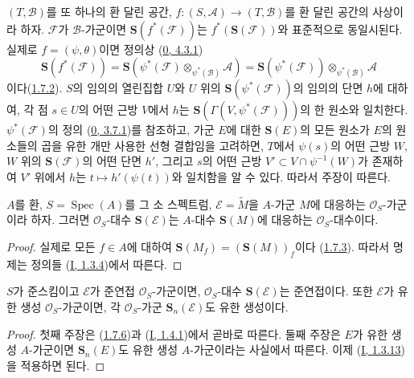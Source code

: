 \begin{env}[1.7.5]
\label{II.1.7.5-ko}
$(T,\mathcal{B})$를 또 하나의 환 달린 공간,
$f:(S,\mathcal{A})\to(T,\mathcal{B})$를 환 달린 공간의 사상이라 하자.
$\mathcal{F}$가 $\mathcal{B}$-가군이면
$\mathbf{S}(f^*(\mathcal{F}))$는
$f^*(\mathbf{S}(\mathcal{F}))$와 표준적으로 동일시된다. 실제로
$f=(\psi,\theta)$이면 정의상
(\hyperref[0.4.3.1-ko]{0, 4.3.1})
\[
  \mathbf{S}(f^*(\mathcal{F}))
  =\mathbf{S}(\psi^*(\mathcal{F})
    \otimes_{\psi^*(\mathcal{B})}\mathcal{A})
  =\mathbf{S}(\psi^*(\mathcal{F}))
    \otimes_{\psi^*(\mathcal{B})}\mathcal{A}
\]
이다(\hyperref[II.1.7.2-ko]{1.7.2}). $S$의 임의의 열린집합 $U$와
$U$ 위의 $\mathbf{S}(\psi^*(\mathcal{F}))$의 임의의 단면 $h$에
대하여, 각 점 $s\in U$의 어떤 근방 $V$에서 $h$는
$\mathbf{S}(\Gamma(V,\psi^*(\mathcal{F})))$의 한 원소와 일치한다.
$\psi^*(\mathcal{F})$의 정의
(\hyperref[0.3.7.1-ko]{0, 3.7.1})를 참조하고, 가군 $E$에 대한
$\mathbf{S}(E)$의 모든 원소가 $E$의 원소들의 곱을 유한 개만 사용한
선형 결합임을 고려하면, $T$에서 $\psi(s)$의 어떤 근방 $W$,
$W$ 위의 $\mathbf{S}(\mathcal{F})$의 어떤 단면 $h'$, 그리고 $s$의
어떤 근방 $V'\subset V\cap\psi^{-1}(W)$가 존재하여 $V'$ 위에서
$h$는 $t\mapsto h'(\psi(t))$와 일치함을 알 수 있다. 따라서 주장이
따른다.
\end{env}

\begin{proposition}[1.7.6]
\label{II.1.7.6-ko}
$A$를 환, $S=\operatorname{Spec}(A)$를 그 소 스펙트럼,
$\mathcal{E}=\widetilde{M}$을 $A$-가군 $M$에 대응하는
$\mathcal{O}_S$-가군이라 하자. 그러면 $\mathcal{O}_S$-대수
$\mathbf{S}(\mathcal{E})$는 $A$-대수 $\mathbf{S}(M)$에 대응하는
$\mathcal{O}_S$-대수이다.
\end{proposition}

\begin{proof}
실제로 모든 $f\in A$에 대하여
$\mathbf{S}(M_f)=(\mathbf{S}(M))_f$이다
(\hyperref[II.1.7.3-ko]{1.7.3}). 따라서 명제는 정의들
(\hyperref[I.1.3.4-ko]{I, 1.3.4})에서 따른다.
\end{proof}

\begin{corollary}[1.7.7]
\label{II.1.7.7-ko}
$S$가 준스킴이고 $\mathcal{E}$가 준연접 $\mathcal{O}_S$-가군이면,
$\mathcal{O}_S$-대수 $\mathbf{S}(\mathcal{E})$는 준연접이다. 또한
$\mathcal{E}$가 유한 생성 $\mathcal{O}_S$-가군이면, 각
$\mathcal{O}_S$-가군 $\mathbf{S}_n(\mathcal{E})$도 유한 생성이다.
\end{corollary}

\begin{proof}
첫째 주장은 (\hyperref[II.1.7.6-ko]{1.7.6})과
(\hyperref[I.1.4.1-ko]{I, 1.4.1})에서 곧바로 따른다. 둘째 주장은
$E$가 유한 생성 $A$-가군이면 $\mathbf{S}_n(E)$도 유한 생성
$A$-가군이라는 사실에서 따른다. 이제
(\hyperref[I.1.3.13-ko]{I, 1.3.13})을 적용하면 된다.
\end{proof}


